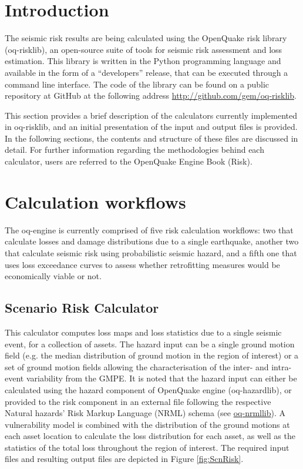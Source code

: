 \section{Introduction}
The seismic risk results are being calculated using the OpenQuake risk library (oq-risklib), an open-source suite of tools for seismic risk assessment and loss estimation. This library is written in the Python programming language and available in the form of a ``developers'' release, that can be executed through a command line interface. The code  of the library can be found on a public repository at GitHub at the following address \href{http://github.com/gem/oq-risklib}{http://github.com/gem/oq-risklib}.

This section provides a brief description of the calculators currently implemented in oq-risklib, and an initial presentation of the input and output files is provided. In the following sections, the contents and structure of these files are discussed in detail. For further information regarding the methodologies behind each calculator, users are referred to the OpenQuake Engine Book (Risk).

\section{Calculation workflows}
\label{sec:riskCalculators}
The oq-engine is currently comprised of five risk calculation workflows: two that calculate losses and damage distributions due to a single earthquake, another two that calculate seismic risk using probabilistic seismic hazard, and a fifth one that uses loss exceedance curves to assess whether retrofitting measures would be economically viable or not.

\subsection{Scenario Risk Calculator}
This calculator computes loss maps and loss statistics due to a single seismic event, for a collection of assets. The hazard input can be a single ground motion field (e.g. the median distribution of ground motion in the region of interest) or a set of ground motion fields allowing the characterisation of the inter- and intra-event variability from the GMPE. It is noted that the hazard input can either be calculated using the hazard component of OpenQuake engine (oq-hazardlib), or provided to the risk component in an external file following the respective Natural hazards' Risk Markup Language (NRML) schema (see \href{http://github.com/gem/oq-nrmllib}{oq-nrmllib}).
A vulnerability model is combined with the distribution of the ground motions at each asset location to calculate the loss distribution for each asset, as well as the statistics of the total loss throughout the region of interest. The required input files and resulting output files are depicted in Figure \ref{fig:ScnRisk}.

